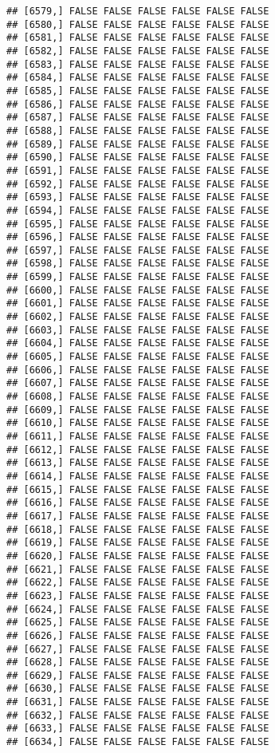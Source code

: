 \documentclass[
]{article}
\begin{document}
\begin{verbatim}
## [6579,] FALSE FALSE FALSE FALSE FALSE FALSE
## [6580,] FALSE FALSE FALSE FALSE FALSE FALSE
## [6581,] FALSE FALSE FALSE FALSE FALSE FALSE
## [6582,] FALSE FALSE FALSE FALSE FALSE FALSE
## [6583,] FALSE FALSE FALSE FALSE FALSE FALSE
## [6584,] FALSE FALSE FALSE FALSE FALSE FALSE
## [6585,] FALSE FALSE FALSE FALSE FALSE FALSE
## [6586,] FALSE FALSE FALSE FALSE FALSE FALSE
## [6587,] FALSE FALSE FALSE FALSE FALSE FALSE
## [6588,] FALSE FALSE FALSE FALSE FALSE FALSE
## [6589,] FALSE FALSE FALSE FALSE FALSE FALSE
## [6590,] FALSE FALSE FALSE FALSE FALSE FALSE
## [6591,] FALSE FALSE FALSE FALSE FALSE FALSE
## [6592,] FALSE FALSE FALSE FALSE FALSE FALSE
## [6593,] FALSE FALSE FALSE FALSE FALSE FALSE
## [6594,] FALSE FALSE FALSE FALSE FALSE FALSE
## [6595,] FALSE FALSE FALSE FALSE FALSE FALSE
## [6596,] FALSE FALSE FALSE FALSE FALSE FALSE
## [6597,] FALSE FALSE FALSE FALSE FALSE FALSE
## [6598,] FALSE FALSE FALSE FALSE FALSE FALSE
## [6599,] FALSE FALSE FALSE FALSE FALSE FALSE
## [6600,] FALSE FALSE FALSE FALSE FALSE FALSE
## [6601,] FALSE FALSE FALSE FALSE FALSE FALSE
## [6602,] FALSE FALSE FALSE FALSE FALSE FALSE
## [6603,] FALSE FALSE FALSE FALSE FALSE FALSE
## [6604,] FALSE FALSE FALSE FALSE FALSE FALSE
## [6605,] FALSE FALSE FALSE FALSE FALSE FALSE
## [6606,] FALSE FALSE FALSE FALSE FALSE FALSE
## [6607,] FALSE FALSE FALSE FALSE FALSE FALSE
## [6608,] FALSE FALSE FALSE FALSE FALSE FALSE
## [6609,] FALSE FALSE FALSE FALSE FALSE FALSE
## [6610,] FALSE FALSE FALSE FALSE FALSE FALSE
## [6611,] FALSE FALSE FALSE FALSE FALSE FALSE
## [6612,] FALSE FALSE FALSE FALSE FALSE FALSE
## [6613,] FALSE FALSE FALSE FALSE FALSE FALSE
## [6614,] FALSE FALSE FALSE FALSE FALSE FALSE
## [6615,] FALSE FALSE FALSE FALSE FALSE FALSE
## [6616,] FALSE FALSE FALSE FALSE FALSE FALSE
## [6617,] FALSE FALSE FALSE FALSE FALSE FALSE
## [6618,] FALSE FALSE FALSE FALSE FALSE FALSE
## [6619,] FALSE FALSE FALSE FALSE FALSE FALSE
## [6620,] FALSE FALSE FALSE FALSE FALSE FALSE
## [6621,] FALSE FALSE FALSE FALSE FALSE FALSE
## [6622,] FALSE FALSE FALSE FALSE FALSE FALSE
## [6623,] FALSE FALSE FALSE FALSE FALSE FALSE
## [6624,] FALSE FALSE FALSE FALSE FALSE FALSE
## [6625,] FALSE FALSE FALSE FALSE FALSE FALSE
## [6626,] FALSE FALSE FALSE FALSE FALSE FALSE
## [6627,] FALSE FALSE FALSE FALSE FALSE FALSE
## [6628,] FALSE FALSE FALSE FALSE FALSE FALSE
## [6629,] FALSE FALSE FALSE FALSE FALSE FALSE
## [6630,] FALSE FALSE FALSE FALSE FALSE FALSE
## [6631,] FALSE FALSE FALSE FALSE FALSE FALSE
## [6632,] FALSE FALSE FALSE FALSE FALSE FALSE
## [6633,] FALSE FALSE FALSE FALSE FALSE FALSE
## [6634,] FALSE FALSE FALSE FALSE FALSE FALSE

\end{verbatim}
\end{document}
